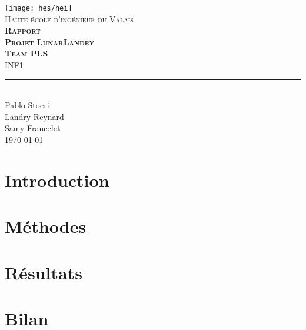 \documentclass[11pt,titlepage]{report}
\def\Team{Team PLS}
\def\Autora{Pablo Stoeri}
\def\Autorb{Landry Reynard}
\def\Autorc{Samy Francelet}
\begin{document}
\begin{titlepage}
	\centering
    \texttt{[image: hes/hei]}\\[1cm] 	%
    \textsc{\LARGE Haute école d'ingénieur du Valais}\\ \vspace{\fill}
    \textbf{\textsc{\fontsize{50}{50}\selectfont Rapport}}\\[0.8cm]
		\textbf{\textsc{\fontsize{30}{30}\selectfont Projet LunarLandry}}\\[0.8cm]
		\textbf{\textsc{\fontsize{20}{20}\selectfont \Team }}\\ \vspace{\fill}
	\textsc{\LARGE INF1}\\[0.4cm]
	\rule{\linewidth}{0.2 mm} \\[0.5 cm]
		\Autora \\
		\Autorb \\
		\Autorc \\[2cm]
	\today
\end{titlepage}
\restoregeometry

\tableofcontents

\chapter{Introduction}


\chapter{Méthodes}


\chapter{Résultats}


\chapter{Bilan}







\end{document}
